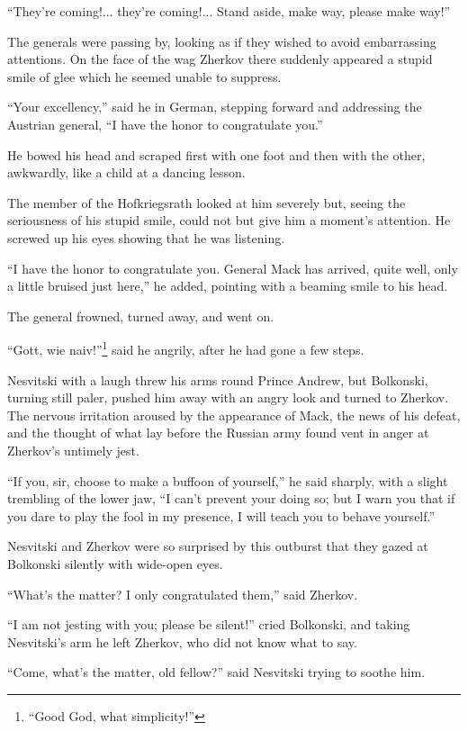``They're coming!... they're coming!... Stand aside, make way,
please make way!''

The generals were passing by, looking as if they wished to avoid
embarrassing attentions. On the face of the wag Zherkov there
suddenly appeared a stupid smile of glee which he seemed unable
to suppress.

``Your excellency,'' said he in German, stepping forward and
addressing the Austrian general, ``I have the honor to
congratulate you.''

He bowed his head and scraped first with one foot and then with
the other, awkwardly, like a child at a dancing lesson.

The member of the Hofkriegsrath looked at him severely but,
seeing the seriousness of his stupid smile, could not but give
him a moment's attention. He screwed up his eyes showing that he
was listening.

``I have the honor to congratulate you. General Mack has arrived,
quite well, only a little bruised just here,'' he added, pointing
with a beaming smile to his head.

The general frowned, turned away, and went on.

``Gott, wie naiv!''\footnote{``Good God, what simplicity!''} said
he angrily, after he had gone a few steps.

Nesvitski with a laugh threw his arms round Prince Andrew, but
Bolkonski, turning still paler, pushed him away with an angry
look and turned to Zherkov. The nervous irritation aroused by the
appearance of Mack, the news of his defeat, and the thought of
what lay before the Russian army found vent in anger at Zherkov's
untimely jest.

``If you, sir, choose to make a buffoon of yourself,'' he said
sharply, with a slight trembling of the lower jaw, ``I can't
prevent your doing so; but I warn you that if you dare to play
the fool in my presence, I will teach you to behave yourself.''

Nesvitski and Zherkov were so surprised by this outburst that
they gazed at Bolkonski silently with wide-open eyes.

``What's the matter? I only congratulated them,'' said Zherkov.

``I am not jesting with you; please be silent!'' cried Bolkonski,
and taking Nesvitski's arm he left Zherkov, who did not know what
to say.

``Come, what's the matter, old fellow?'' said Nesvitski trying to
soothe him.

